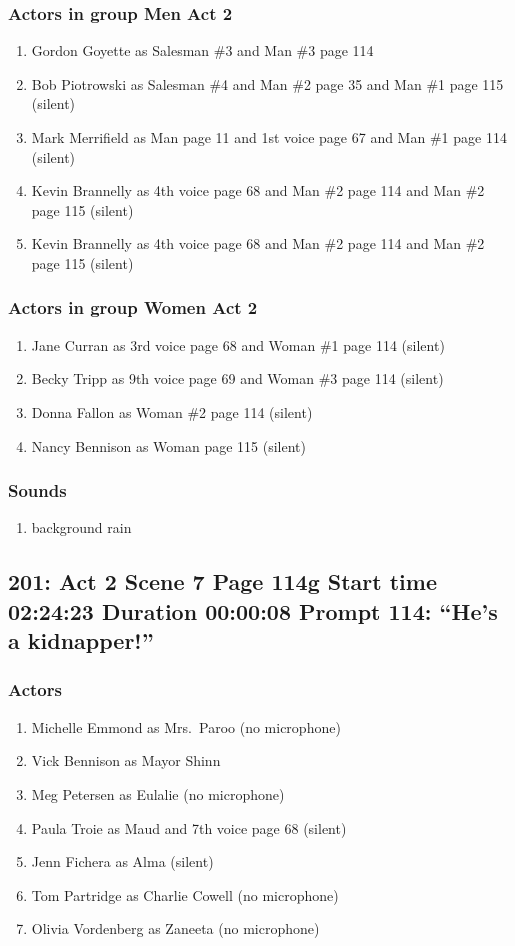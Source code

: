 \subsubsection{Actors in group Men Act 2}
\begin{enumerate}
\item Gordon Goyette as Salesman \#3 and Man \#3 page 114
\item Bob Piotrowski as Salesman \#4 and Man \#2 page 35 and Man \#1 page 115 (silent)
\item Mark Merrifield as Man page 11 and 1st voice page 67 and Man \#1 page 114 (silent)
\item Kevin Brannelly as 4th voice page 68 and Man \#2 page 114 and Man \#2 page 115 (silent)
\item Kevin Brannelly as 4th voice page 68 and Man \#2 page 114 and Man \#2 page 115 (silent)
\end{enumerate}
\subsubsection{Actors in group Women Act 2}
\begin{enumerate}
\item Jane Curran as 3rd voice page 68 and Woman \#1 page 114 (silent)
\item Becky Tripp as 9th voice page 69 and Woman \#3 page 114 (silent)
\item Donna Fallon as Woman \#2 page 114 (silent)
\item Nancy Bennison as Woman page 115 (silent)
\end{enumerate}

\subsubsection{Sounds}
\begin{enumerate}
\item background rain
\end{enumerate}
\subsection{201: Act 2 Scene 7 Page 114g Start time 02:24:23 Duration 00:00:08 Prompt 114: ``He's a kidnapper!''}

\subsubsection{Actors}
\begin{enumerate}
\item Michelle Emmond as Mrs.~Paroo (no microphone)
\item Vick Bennison as Mayor Shinn
\item Meg Petersen as Eulalie (no microphone)
\item Paula Troie as Maud and 7th voice page 68 (silent)
\item Jenn Fichera as Alma (silent)
\item Tom Partridge as Charlie Cowell (no microphone)
\item Olivia Vordenberg as Zaneeta (no microphone)
\end{enumerate}
